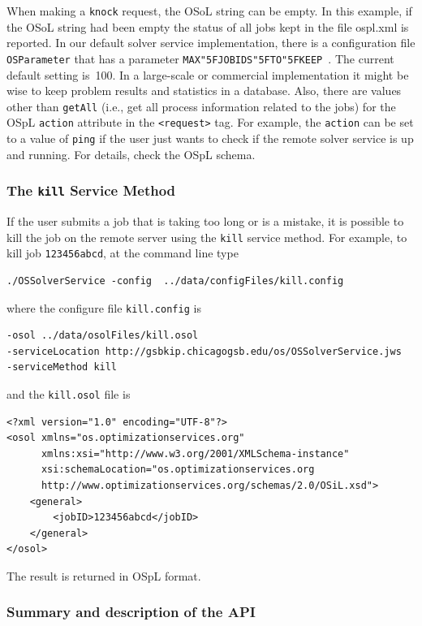 \documentclass[11pt]{article}
\renewcommand{\_}{{\char"5F}}
\renewcommand{\{}{{\char"7B}}
\renewcommand{\}}{{\char"7D}}
\renewcommand{\^}{{\char"0D}}
\renewcommand{\'}{{\char"0D}}
\begin{document}
\begin{enumerate}[Step 1:]
When making a {\tt knock} request,  the OSoL string can be empty. In this example, if the OSoL string had been empty
the status of all jobs kept in the file ospl.xml is reported.  In our default solver service implementation,
there is a configuration file {\tt OSParameter} that has a parameter {\tt MAX\_JOBIDS\_TO\_KEEP }.
The current default setting is~100. In a large-scale or commercial implementation it might be wise to keep
problem results and statistics in a database. Also, there are values other than {\tt getAll} (i.e., get all
process information related to the jobs) for the OSpL {\tt action} attribute in the {\tt <request>} tag.
For example, the {\tt action} can be set to a value of {\tt ping} if the user just wants
to check if the remote solver service is up and running. For details, check the OSpL schema.


\subsubsection{The  {\tt kill}   Service Method}

If the user submits a job that is taking too long or is a mistake, it is possible to kill the job on the remote server using the {\tt kill} service method.
For example, to kill job {\tt 123456abcd}, at the command line type
\begin{verbatim}
./OSSolverService -config  ../data/configFiles/kill.config
\end{verbatim}
where the configure file {\tt kill.config} is
\begin{verbatim}
-osol ../data/osolFiles/kill.osol
-serviceLocation http://gsbkip.chicagogsb.edu/os/OSSolverService.jws
-serviceMethod kill
\end{verbatim}
and the {\tt kill.osol} file is
\begin{verbatim}
<?xml version="1.0" encoding="UTF-8"?>
<osol xmlns="os.optimizationservices.org"
      xmlns:xsi="http://www.w3.org/2001/XMLSchema-instance"
      xsi:schemaLocation="os.optimizationservices.org
      http://www.optimizationservices.org/schemas/2.0/OSiL.xsd">
    <general>
        <jobID>123456abcd</jobID>
    </general>
</osol>
\end{verbatim}

The result is returned in  OSpL format.



\subsubsection{Summary and description of the API}


\end{enumerate}
\end{document}
